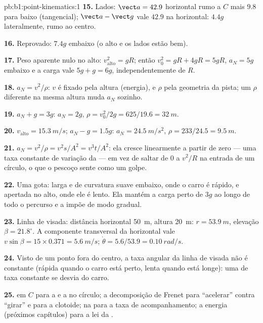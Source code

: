 \begin{solution}{pb:b1:point-kinematics:1}
\textbf{15.} Lados: $\vect a = 42.9$ horizontal rumo a $C$ mais $9.8$
para baixo (tangencial); $\vect a - \vect g$ vale $42.9$ na horizontal: $4.4g$
lateralmente, rumo ao centro.

\textbf{16.} Reprovado: $7.4g$ embaixo (o alto e os lados estão bem).

\textbf{17.} Peso aparente nulo no alto: $v_{\text{alto}}^2 = gR$;
então $v_0^2 = gR + 4gR = 5gR$, $a_N = 5g$ embaixo e a carga vale
$5g + g = 6g$, independentemente de $R$.

\textbf{18.} $a_N = v^2/\rho$: $v$ é fixado pela altura (energia), e $\rho$
pela geometria da pista; um $\rho$ diferente na mesma altura muda
$a_N$ sozinho.

\textbf{19.} $a_N + g = 3g$: $a_N = 2g$, $\rho = v_0^2/2g = 625/19.6 =
\qty{32}{m}$.

\textbf{20.} $v_{\text{alto}} = \qty{15.3}{m/s}$; $a_N - g = 1.5g$: $a_N =
\qty{24.5}{m/s^2}$, $\rho = 233/24.5 = \qty{9.5}{m}$.

\textbf{21.} $a_N = v^2/\rho = v^2s/A^2 = v^3t/A^2$: ela cresce linearmente
a partir de zero --- uma taxa constante de variação da  --- em vez de
saltar de $0$ a $v^2/R$ na entrada de um círculo, o que o pescoço
sente como um golpe.

\textbf{22.} Uma gota: larga e de curvatura suave embaixo, onde o
carro é rápido, e apertada no alto, onde ele é lento. Ela mantém a carga perto de
$3g$ ao longo de todo o percurso e a impõe de modo gradual.

\textbf{23.} Linha de visada: distância horizontal \qty{50}{m}, altura
\qty{20}{m}: $r = \qty{53.9}{m}$, elevação $\beta = 21.8^\circ$. A
componente transversal da  horizontal vale $v\sin\beta = 15 \times
0.371 = \qty{5.6}{m/s}$; $\dot\theta = 5.6/53.9 = \qty{0.10}{rad/s}$.

\textbf{24.} Visto de um ponto fora do centro, a taxa angular da linha
de visada não é constante (rápida quando o carro está perto, lenta quando está longe):
uma  de taxa constante se desvia do carro.

\textbf{25.}  em $C$ para a  e a  no
círculo; a decomposição de Frenet para ``acelerar'' contra ``girar'' e
para a clotoide;  na  para a taxa de
acompanhamento; a energia (próximos capítulos) para a lei da .
\end{solution}
